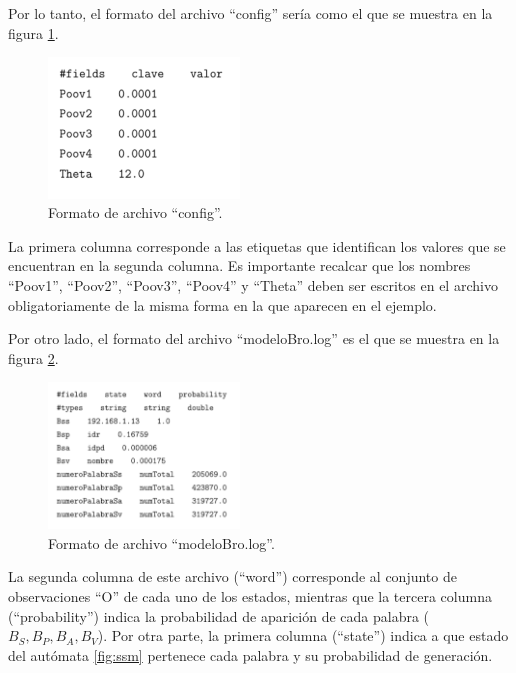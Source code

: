 Por lo tanto, el formato del archivo ``config'' sería como el que se muestra en la figura \ref{fig:archivoConfig}.

\begin{figure}[!htb]
\begin{center}
\includegraphics[width=2in]{./img/config.png}
\caption{Formato de archivo ``config''.}
\label{fig:archivoConfig}
\end{center}
\end{figure}	

La primera columna corresponde a las etiquetas que identifican los valores que se encuentran en la segunda columna. Es importante recalcar que los nombres ``Poov1'', ``Poov2'', ``Poov3'', ``Poov4'' y ``Theta'' deben ser escritos en el archivo obligatoriamente de la misma forma en la que aparecen en el ejemplo.

Por otro lado, el formato del archivo ``modeloBro.log'' es el que se muestra en la figura \ref{fig:archivoModeloBro}.

\begin{figure}[!htb]
\begin{center}
\includegraphics[width=2in]{./img/modeloBro.png}
\caption{Formato de archivo ``modeloBro.log''.}
\label{fig:archivoModeloBro}
\end{center}
\end{figure}	

La segunda columna de este archivo (``word'') corresponde al conjunto de observaciones ``O'' de cada uno de los estados, mientras que la tercera columna (``probability'') indica la probabilidad de aparición de cada palabra ($B_{S}, B_{P}, B_{A}, B_{V}$). Por otra parte, la primera columna (``state'') indica a que estado del autómata \ref{fig:ssm} pertenece cada palabra y su probabilidad de generación.

